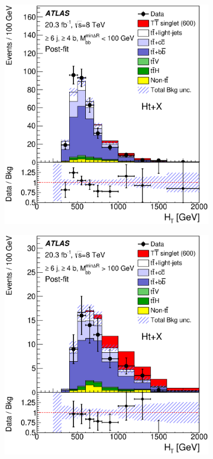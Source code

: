 \begin{figure}[!tp]
\begin{center}
\begin{subfigure}{0.49\textwidth}
\caption{}\end{subfigure}
  \begin{subfigure}{0.49\textwidth}
\includegraphics[width=\textwidth]{Analysis/Figures_HtX/HtXPaper/HtX/postfit_unblind/HTAll_6jetin4btaginOutHmv18TeV.eps}
\caption{}\end{subfigure}
  \begin{subfigure}{0.49\textwidth}
\includegraphics[width=\textwidth]{Analysis/Figures_HtX/HtXPaper/HtX/postfit_unblind/HTAll_6jetin4btaginInHmv18TeV.eps}

\end{subfigure}
\end{center}
\end{figure}
